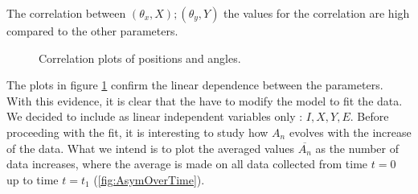 The correlation between $(\theta_{x},X);(\theta_{y},Y)$ the values for the correlation are high compared to the other parameters. 

\begin{figure}[ht]
\centering
{}
\caption{Correlation plots of positions and angles.}
\label{fig:CorrelationBeam}
\end{figure}

The plots in figure \ref{fig:CorrelationBeam} confirm the linear dependence between the parameters. With this evidence, it is clear that the have to modify the model to fit the data. We decided to include as linear independent variables only : $I,X,Y,E$. Before proceeding with the fit, it is interesting to study how $A_{n}$ evolves with the increase of the data. What we intend is to plot the averaged values $\overline{A_{n}}$ as the number of data increases, where the average is made on all data collected from time $t = 0$ up to time $t = t_{1}$ (\ref{fig:AsymOverTime}). 

